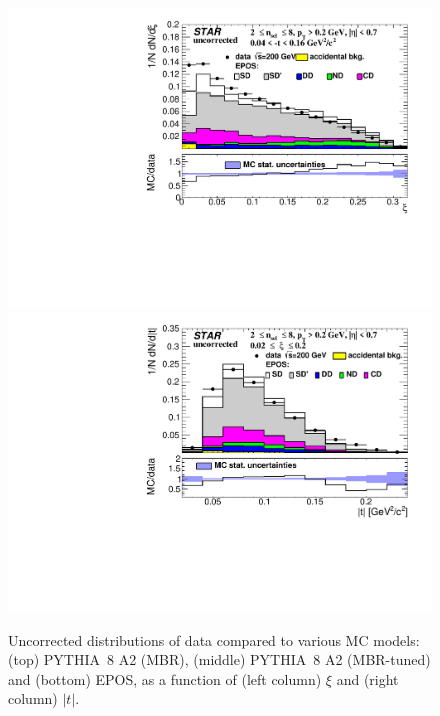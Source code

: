 \begin{figure}[h!]
	\includegraphics[width=.49\textwidth,page=1]{chapters/chrgSTAR/img/nonSD/SDT_epos_xi0_RP_starsim_xi.pdf}
	\hfill
	\includegraphics[width=.49\textwidth,page=1]{chapters/chrgSTAR/img/nonSD/SDT_epos_xi0_RP_starsim_t.pdf}
	\caption{Uncorrected distributions of data compared to various MC models: (top) PYTHIA~8 A2 (MBR), (middle) PYTHIA~8 A2 (MBR-tuned) and (bottom) EPOS, as a function of (left column) $\xi$  and (right column) $|t|$.}
	\label{fig:nonSDxit}
	\vspace{-1.5cm}
\end{figure}

